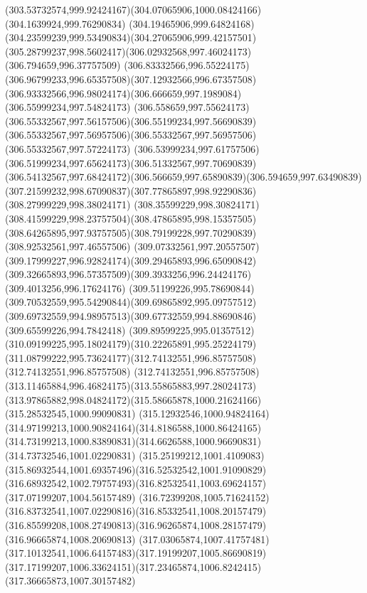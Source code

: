 {    \curveto(303.53732574,999.92424167)(304.07065906,1000.08424166)(304.1639924,999.76290834)
    \curveto(304.19465906,999.64824168)(304.23599239,999.53490834)(304.27065906,999.42157501)
    \curveto(305.28799237,998.5602417)(306.02932568,997.46024173)(306.794659,996.37757509)
    \curveto(306.83332566,996.55224175)(306.96799233,996.65357508)(307.12932566,996.67357508)
    \curveto(306.93332566,996.98024174)(306.666659,997.1989084)(306.55999234,997.54824173)
    \curveto(306.558659,997.55624173)(306.55332567,997.56157506)(306.55199234,997.56690839)
    \curveto(306.55332567,997.56957506)(306.55332567,997.56957506)(306.55332567,997.57224173)
    \curveto(306.53999234,997.61757506)(306.51999234,997.65624173)(306.51332567,997.70690839)
    \curveto(306.54132567,997.68424172)(306.566659,997.65890839)(306.594659,997.63490839)
    \curveto(307.21599232,998.67090837)(307.77865897,998.92290836)(308.27999229,998.38024171)
    \curveto(308.35599229,998.30824171)(308.41599229,998.23757504)(308.47865895,998.15357505)
    \curveto(308.64265895,997.93757505)(308.79199228,997.70290839)(308.92532561,997.46557506)
    \curveto(309.07332561,997.20557507)(309.17999227,996.92824174)(309.29465893,996.65090842)
    \curveto(309.32665893,996.57357509)(309.3933256,996.24424176)(309.4013256,996.17624176)
    \curveto(309.51199226,995.78690844)(309.70532559,995.54290844)(309.69865892,995.09757512)
    \curveto(309.69732559,994.98957513)(309.67732559,994.88690846)(309.65599226,994.7842418)
    \curveto(309.89599225,995.01357512)(310.09199225,995.18024179)(310.22265891,995.25224179)
    \curveto(311.08799222,995.73624177)(312.74132551,996.85757508)(312.74132551,996.85757508)
    \curveto(312.74132551,996.85757508)(313.11465884,996.46824175)(313.55865883,997.28024173)
    \curveto(313.97865882,998.04824172)(315.58665878,1000.21624166)(315.28532545,1000.99090831)
    \curveto(315.12932546,1000.94824164)(314.97199213,1000.90824164)(314.8186588,1000.86424165)
    \curveto(314.73199213,1000.83890831)(314.6626588,1000.96690831)(314.73732546,1001.02290831)
    \curveto(315.25199212,1001.4109083)(315.86932544,1001.69357496)(316.52532542,1001.91090829)
    \curveto(316.68932542,1002.79757493)(316.82532541,1003.69624157)(317.07199207,1004.56157489)
    \curveto(316.72399208,1005.71624152)(316.83732541,1007.02290816)(316.85332541,1008.20157479)
    \curveto(316.85599208,1008.27490813)(316.96265874,1008.28157479)(316.96665874,1008.20690813)
    \curveto(317.03065874,1007.41757481)(317.10132541,1006.64157483)(317.19199207,1005.86690819)
    \curveto(317.17199207,1006.33624151)(317.23465874,1006.8242415)(317.36665873,1007.30157482)
}
